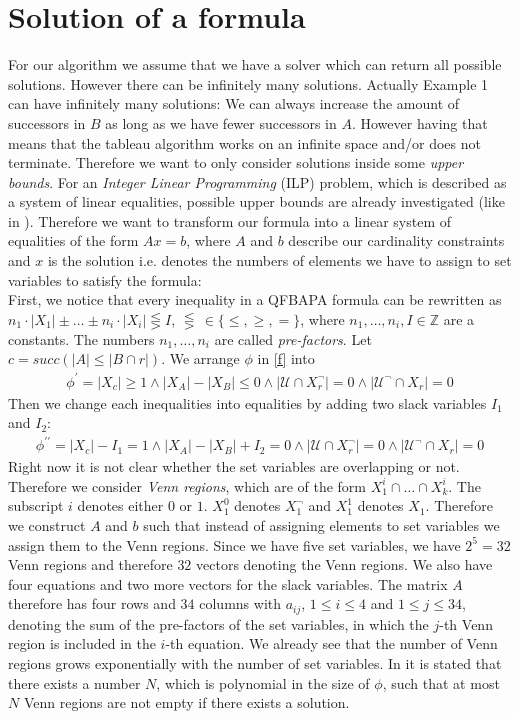 \documentclass{book}
\theoremstyle{break}
\theoremstyle{definition}
\begin{document}
\section{Solution of a formula}
For our algorithm we assume that we have a solver which can return all possible solutions. However there can be infinitely many solutions. Actually Example 1 can have infinitely many solutions: We can always increase the amount of successors in $B$ as long as we have fewer successors in $A$. However having that means that the tableau algorithm works on an infinite space and/or does not terminate. Therefore we want to only consider solutions inside some \textit{upper bounds}. For an \textit{Integer Linear Programming} (ILP) problem, which is described as a system of linear equalities, possible upper bounds are already investigated (like in \cite{knapsack}). Therefore we want to transform our formula into a linear system of equalities of the form $Ax=b$, where $A$ and $b$ describe our cardinality constraints and $x$ is the solution i.e. denotes the numbers of elements we have to assign to set variables to satisfy the formula:\\
First, we notice that every inequality in a QFBAPA formula can be
rewritten as $n_1\cdot|X_1|\pm \dots \pm n_i\cdot|X_i|\lesseqgtr I$, $\lesseqgtr\,\in\{\leq,\geq,=\}$, where $n_1,\dots, n_i,I\in\mathbb{Z}$ are a constants. The numbers $n_1,\dots,n_i$ are called \textit{pre-factors}. Let $c={succ(|A|\leq |B\cap r|)}$. We arrange $\phi$ in \eqref{f} into
\begin{align*}
\phi^\prime=|X_{c}|\geq 1\wedge |X_A|- |X_B|\leq 0 \wedge |\mathcal{U}\cap X_r^\neg|=0\wedge |\mathcal{U}^\neg\cap X_r|=0
\end{align*} 
Then we change each inequalities into equalities by adding two slack variables $I_1$ and $I_2$:
\begin{align*}
\phi^{\prime\prime}=|X_{c}|- I_1= 1\wedge |X_A|-|X_B|+I_2= 0 \wedge |\mathcal{U}\cap X_r^\neg|=0\wedge |\mathcal{U}^\neg\cap X_r|=0
\end{align*}
Right now it is not clear whether the set variables are overlapping or not. Therefore we consider \textit{Venn regions}, which are of the form $X^i_1\cap \dots \cap X^i_k$. The subscript $i$ denotes either $0$ or $1$. $X^0_1$ denotes $X^\neg_1$ and $X^1_1$ denotes $X_1$. Therefore we construct $A$ and $b$ such that instead of assigning elements to set variables we assign them to the Venn regions. Since we have five set variables, we have $2^5=32$ Venn regions and therefore $32$ vectors denoting the Venn regions. We also have four equations and two more vectors for the slack variables. The matrix $A$ therefore has four rows and $34$ columns with $a_{ij}$, $1\leq i\leq 4$ and $1\leq j\leq 34$, denoting the sum of the pre-factors of the set variables, in which the $j$-th Venn region is included in the $i$-th equation. We already see that the number of Venn regions grows exponentially with the number of set variables. In \cite{4} it is stated that there exists a number $N$, which is polynomial in the size of $\phi$, such that at most $N$ Venn regions are not empty if there exists a solution.
\end{document}
